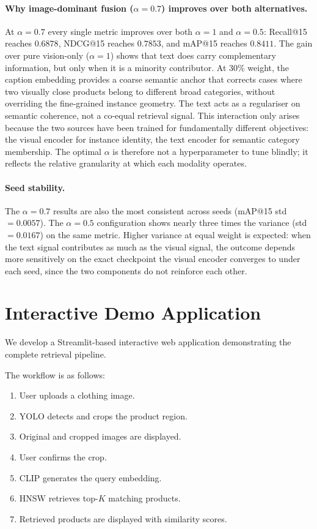 \documentclass[12pt,a4paper]{article}
\begin{document}
\paragraph{Why image-dominant fusion ($\alpha=0.7$) improves over both alternatives.}
At $\alpha=0.7$ every single metric improves over both $\alpha=1$ and
$\alpha=0.5$: Recall@15 reaches $0.6878$, NDCG@15 reaches $0.7853$,
and mAP@15 reaches $0.8411$.
The gain over pure vision-only ($\alpha=1$) shows that text does carry
complementary information, but only when it is a minority contributor.
At 30\% weight, the caption embedding provides a coarse semantic anchor
that corrects cases where two visually close products belong to different
broad categories, without overriding the fine-grained instance geometry.
The text acts as a regulariser on semantic coherence, not a co-equal
retrieval signal.
This interaction only arises because the two sources have been trained
for fundamentally different objectives: the visual encoder for instance
identity, the text encoder for semantic category membership.
The optimal $\alpha$ is therefore not a hyperparameter to tune blindly;
it reflects the relative granularity at which each modality operates.

\paragraph{Seed stability.}
The $\alpha=0.7$ results are also the most consistent across seeds
(mAP@15 std $= 0.0057$).
The $\alpha=0.5$ configuration shows nearly three times the variance
(std $= 0.0167$) on the same metric.
Higher variance at equal weight is expected: when the text signal
contributes as much as the visual signal, the outcome depends more
sensitively on the exact checkpoint the visual encoder converges to
under each seed, since the two components do not reinforce each other.

\section{Interactive Demo Application}

We develop a Streamlit-based interactive web application demonstrating the
complete retrieval pipeline.

The workflow is as follows:

\begin{enumerate}[noitemsep]
    \item User uploads a clothing image.
    \item YOLO detects and crops the product region.
    \item Original and cropped images are displayed.
    \item User confirms the crop.
    \item CLIP generates the query embedding.
    \item HNSW retrieves top-$K$ matching products.
    \item Retrieved products are displayed with similarity scores.
\end{enumerate}
\end{document}
